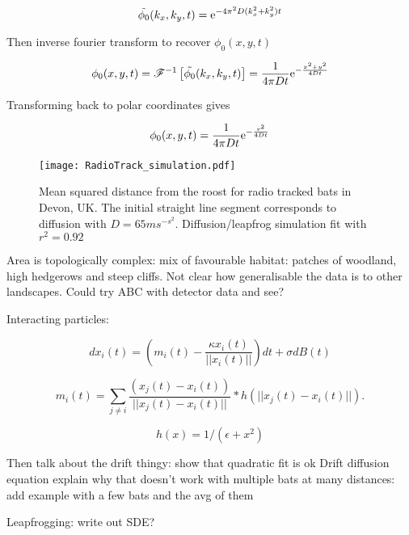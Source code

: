 \begin{equation}
  \tilde{\phi_0}(k_x,k_y,t) = \mathrm{e}^{-4\pi^2D(k_x^2 + k_y^2)t} \\
\end{equation}

Then inverse fourier transform to recover $\phi_0(x,y,t)$

\begin{equation}
  \phi_0(x,y,t) = \mathscr{F}^{-1}\left[\tilde{\phi_0}(k_x,k_y,t)\right] = \frac{1}{4\pi Dt}\mathrm{e}^{-\frac{x^2 + y^2}{4Dt}} \\
\end{equation}

Transforming back to polar coordinates gives

\begin{equation}
  \phi_0(x,y,t) = \frac{1}{4\pi Dt}\mathrm{e}^{-\frac{r^2}{4Dt}} \\
  \label{eqn:phi_0}
\end{equation}

\begin{figure} [h]
    \centering
        \texttt{[image: RadioTrack\_simulation.pdf]}
        \caption{Mean squared distance from the roost for radio tracked bats in Devon, UK. The initial straight line segment corresponds to diffusion with $D = 65 ms^{-s^2}$. Diffusion/leapfrog simulation fit with $r^2 = 0.92$}
    \label{fig:radiotrack_fit}
\end{figure}




Area is topologically complex: mix of favourable habitat: patches of woodland, high hedgerows and steep cliffs. Not clear how generalisable the data is to other landscapes. Could try ABC with detector data and see?

Interacting particles:

\begin{equation}
dx_i(t) = (m_i(t) - \frac{\kappa x_i(t)}{||x_i(t)||}) dt + \sigma dB(t)
\end{equation}

\begin{equation}
m_i(t) = \sum_{j \neq i} \frac{(x_j(t) - x_i(t))}{||x_j(t) - x_i(t)||} * h(||x_j(t) - x_i(t)||).
\end{equation}

\begin{equation}
h(x) = 1/(\epsilon + x^2)
\end{equation}

Then talk about the drift thingy:
show that quadratic fit is ok
Drift diffusion equation
explain why that doesn't work with multiple bats at many distances: add example with a few bats and the avg of them

Leapfrogging: write out SDE?
